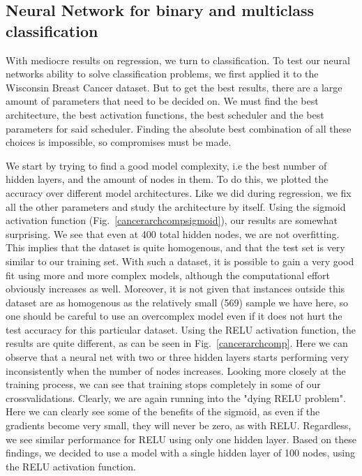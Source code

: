 \documentclass[onecolumn,10pt,cleanfoot]{asme2ej}
\begin{document}
\subsection{Neural Network for binary and multiclass classification}

With mediocre results on regression, we turn to classification. To test our neural networks ability to solve classification problems, we first applied it to the Wisconsin Breast Cancer dataset. But to get the best results, there are a large amount of parameters that need to be decided on. We must find the best architecture, the best activation functions, the best scheduler and the best parameters for said scheduler. Finding the absolute best combination of all these choices is impossible, so compromises must be made.

We start by trying to find a good model complexity, i.e the best number of hidden layers, and the amount of nodes in them. To do this, we plotted the accuracy over different model architectures. Like we did during regression, we fix all the other parameters and study the architecture by itself. Using the sigmoid activation function (Fig.~\ref{cancerarchcompsigmoid}), our results are somewhat surprising. We see that even at 400 total hidden nodes, we are not overfitting. This implies that the dataset is quite homogenous, and that the test set is very similar to our training set. With such a dataset, it is possible to gain a very good fit using more and more complex models, although the computational effort obviously increases as well. Moreover, it is not given that instances outside this dataset are as homogenous as the relatively small (569) sample we have here, so one should be careful to use an overcomplex model even if it does not hurt the test accuracy for this particular dataset. Using the RELU activation function, the results are quite different, as can be seen in Fig.~\ref{cancerarchcomp}. Here we can observe that a neural net with two or three hidden layers starts performing very inconsistently when the number of nodes increases. Looking more closely at the training process, we can see that training stops completely in some of our crossvalidations. Clearly, we are again running into the "dying RELU problem". Here we can clearly see some of the benefits of the sigmoid, as even if the gradients become very small, they will never be zero, as with RELU. Regardless, we see similar performance for RELU using only one hidden layer. Based on these findings, we decided to use a model with a single hidden layer of 100 nodes, using the RELU activation function.
\end{document}
